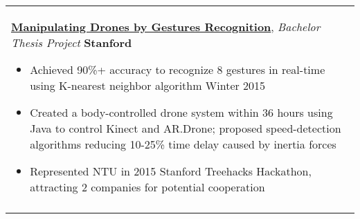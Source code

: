 \documentclass[a4paper,11pt]{article} %
\begin{document}
{\begin{tabular}{p{18.5cm}}
\href{https://www.youtube.com/watch?v=jxsZaQ6PcXU}{\bf{Manipulating Drones by Gestures Recognition}}, {\it{Bachelor Thesis Project}} \hfill {\bf{Stanford}}
\begin{itemize}%
\item Achieved 90\%+ accuracy to recognize 8 gestures in real-time using K-nearest neighbor algorithm \hfill Winter 2015 
\item Created a body-controlled drone system within 36 hours using Java to control Kinect and AR.Drone; proposed speed-detection algorithms reducing 10-25\% time delay caused by inertia forces
\item Represented NTU in 2015 Stanford Treehacks Hackathon, attracting 2 companies for potential cooperation \vspace*{-\baselineskip}
\end{itemize}\\
\vspace{.1mm}


\end{tabular}}
\end{document}
